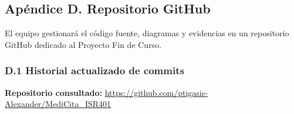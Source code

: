 \documentclass[11pt,a4paper]{article}
\begin{document}
	
	
	\subsection{Apéndice D. Repositorio GitHub}
	
	El equipo gestionará el código fuente, diagramas y evidencias en un repositorio GitHub dedicado al Proyecto Fin de Curso.
	
	
	\subsubsection{D.1 Historial actualizado de commits}
	
	
	\noindent
	\textbf{Repositorio consultado:}
	\url{https://github.com/ptigasis-Alexander/MediCita_ISR401}
	
	
	\begingroup
	\scriptsize
	\setlength{\tabcolsep}{3pt}
	\renewcommand{\arraystretch}{1.15}
	
\end{document}
